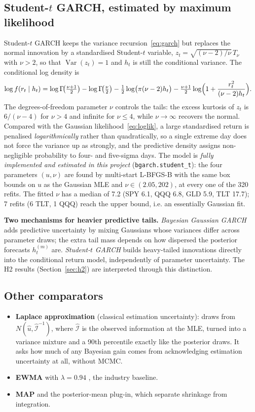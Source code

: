 \documentclass[11pt]{article}
\newcommand{\Var}{\operatorname{Var}}
\newcommand{\keybox}[1]{\par\smallskip\noindent\colorbox{boxbg}{\parbox{\dimexpr\textwidth-2\fboxsep}{#1}}\par\smallskip}
\begin{document}
\subsection{Student-\texorpdfstring{$t$}{t} GARCH, estimated by maximum likelihood}
Student-$t$ GARCH \cite{bollerslev1987} keeps the variance recursion~\eqref{eq:garch} but replaces the normal
innovation by a standardised Student-$t$ variable, $z_t=\sqrt{(\nu-2)/\nu}\,T_\nu$ with $\nu>2$, so that
$\Var(z_t)=1$ and $h_t$ is still the conditional variance. The conditional log density is
\begin{equation}\label{eq:tdens}
\log f(r_t\mid h_t)=\log\Gamma\!\bigl(\tfrac{\nu+1}2\bigr)-\log\Gamma\!\bigl(\tfrac\nu2\bigr)-\tfrac12\log\bigl(\pi(\nu-2)h_t\bigr)
-\tfrac{\nu+1}{2}\log\Bigl(1+\frac{r_t^2}{(\nu-2)h_t}\Bigr).
\end{equation}
The degrees-of-freedom parameter $\nu$ controls the tails: the excess kurtosis of $z_t$ is $6/(\nu-4)$ for $\nu>4$
and infinite for $\nu\le4$, while $\nu\to\infty$ recovers the normal. Compared with the Gaussian
likelihood~\eqref{eq:loglik}, a large standardised return is penalised \emph{logarithmically} rather than
quadratically, so a single extreme day does not force the variance up as strongly, and the predictive density
assigns non-negligible probability to four- and five-sigma days. The model is \emph{fully implemented and estimated
in this project} (\texttt{bgarch.student\_t}): the four parameters $(u,\nu)$ are found by multi-start L-BFGS-B with
the same box bounds on $u$ as the Gaussian MLE and $\nu\in(2.05,202)$, at every one of the 320 refits. The fitted
$\nu$ has a median of 7.2 (SPY 6.1, QQQ 6.8, GLD 5.9, TLT 17.7); 7 refits (6 TLT, 1 QQQ) reach the upper bound, i.e.
an essentially Gaussian fit.

\keybox{\small\textbf{Two mechanisms for heavier predictive tails.} \emph{Bayesian Gaussian GARCH} adds predictive
uncertainty by mixing Gaussians whose variances differ across parameter draws; the extra tail mass depends on how
dispersed the posterior forecasts $h_t^{(m)}$ are. \emph{Student-$t$ GARCH} builds heavy-tailed innovations directly
into the conditional return model, independently of parameter uncertainty. The H2 results (Section~\ref{sec:h2})
are interpreted through this distinction.}

\subsection{Other comparators}
\begin{itemize}
\item \textbf{Laplace approximation} (classical estimation uncertainty): draws from $N(\hat u,\hat{\mathcal I}^{-1})$,
where $\hat{\mathcal I}$ is the observed information at the MLE, turned into a variance mixture and a 90th
percentile exactly like the posterior draws. It asks how much of any Bayesian gain comes from acknowledging
estimation uncertainty at all, without MCMC.
\item \textbf{EWMA} with $\lambda=0.94$ \cite{riskmetrics1996}, the industry baseline.
\item \textbf{MAP} and the posterior-mean plug-in, which separate shrinkage from integration.
\end{itemize}
\end{document}
